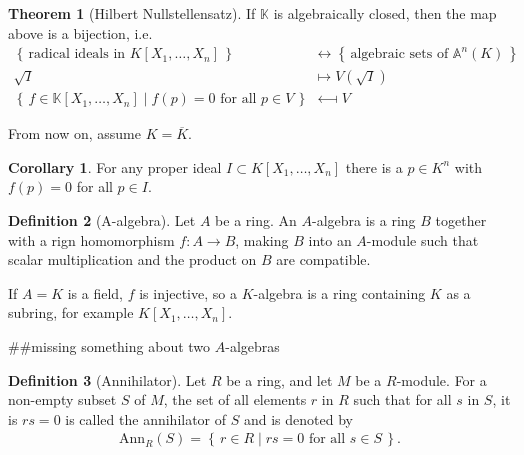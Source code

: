 \documentclass[a4paper]{book}
\theoremstyle{definition}
\newtheorem{definition}{Definition}[]
\newtheorem{theorem}[definition]{Theorem}
\newtheorem{corollary}{Corollary}
\newcommand{\set}[1]{\left\{\, #1 \,\right\}}
\newcommand{\makeset}[2]{\left\{\, #1 \mid #2 \,\right\}}
\begin{document}
\begin{thmbox}
    \begin{theorem}[Hilbert Nullstellensatz]
        If \(\mathbb{K}\) is algebraically closed, then the map above is a bijection, i.e.
        \begin{align*}
            \set{\text{radical ideals in } K[X_1, \ldots, X_n]} &\longleftrightarrow \set{\text{algebraic sets of }\mathbb{A}^n(K)} \\
            \sqrt{I} &\longmapsto V(\sqrt{I}) \\
            \makeset{f \in \mathbb{K}[X_1, \ldots, X_n]}{f(p) = 0 \text{ for all } p \in V} &\longmapsfrom V
        \end{align*}
    \end{theorem}
\end{thmbox}

From now on, assume \(K = \overline{K}\).
\begin{thmbox}    
    \begin{corollary}
        For any proper ideal \(I \subset K[X_1, \ldots, X_n]\) there is a \(p \in K^n\) with \(f(p) = 0\) for all \(p \in I\).
    \end{corollary}
\end{thmbox}

\begin{defbox}
    \begin{definition}[A-algebra]
        Let \(A\) be a ring. An \(A\)-algebra is a ring \(B\) together with a rign homomorphism \(f: A \longrightarrow B\), making \(B\) into an \(A\)-module such that scalar multiplication and the product on \(B\) are compatible.

        If \(A = K\) is a field, \(f\) is injective, so a \(K\)-algebra is a ring containing \(K\) as a subring, for example \(K[X_1, \ldots, X_n]\).

        \#\#missing something about two \(A\)-algebras
    \end{definition}
\end{defbox}

\begin{definition}[Annihilator]
    Let \(R\) be a ring, and let \(M\) be a \(R\)-module. For a non-empty subset \(S\) of \(M\), the set of all elements \(r\) in \(R\) such that for all \(s\) in \(S\), it is \(rs = 0\) is called the annihilator of \(S\) and is denoted by
    \begin{align*}
        \text{Ann}_R(S) = \makeset{r \in R}{rs = 0 \text{ for all } s \in S} \text{.}
    \end{align*}
\end{definition}
\end{document}
